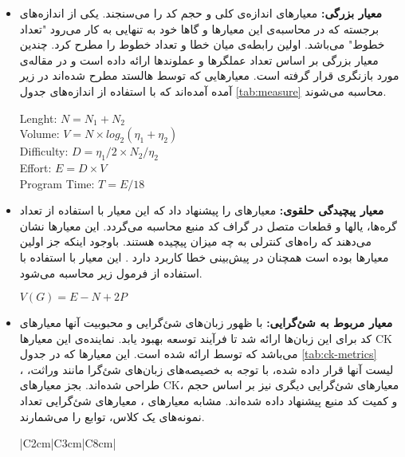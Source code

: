 \begin{itemize}
	\item \textbf{معیار بزرگی: }
معیارهای  اندازه‌ی کلی و حجم کد را می‌سنجند. یکی از اندازه‌های برجسته که در محاسبه‌ی این معیارها و گاها خود به تنهایی به کار می‌رود "تعداد خطوط" می‌باشد. اولین 
 \cite{akiyama1971example}  
رابطه‌ی میان خطا و تعداد خطوط را مطرح کرد. 
 \cite{halstead1977elements} 
 چندین معیار بزرگی بر اساس  تعداد عملگرها و عملوند‌ها ارائه داده است و در مقاله‌ی \cite{pawade2016exploring} مورد بازنگری قرار گرفته است. معیارهایی که توسط هالستد مطرح شده‌اند در زیر آمده آمده‌اند که با استفاده از اندازه‌های جدول \ref{tab:measure} محاسبه می‌شوند. 
 \begin{latin}
 \baselineskip=1.1cm
Lenght: $N = N_1 + N_2$ \\
Volume: $V = N \times log_2 (\eta_1 + \eta_2)$\\
Difficulty: $D = \eta_1/2 \times N_2/\eta_2$ \\
Effort: $E = D \times V$ \\
Program Time: $T = E/18$ \\
 \end{latin}
 
 
\item \textbf{معیار پیچیدگی حلقوی: }
 معیارهای 
را پیشنهاد داد که این معیار با استفاده از تعداد گره‌ها، یالها و قطعات متصل در گراف   کد منبع محاسبه می‌گردد\cite{mccabe1976complexity}. این معیارها نشان می‌دهند که راه‌های کنترلی به چه میزان پیچیده هستند. باوجود اینکه جز اولین معیارها بوده است همچنان در پیش‌بینی خطا کاربرد دارد \cite{malhotra2014comparative}. این معیار با استفاده با استفاده از فرمول زیر محاسبه می‌شود. 
\begin{latin}
$V(G) = E - N + 2P $
\end{latin}


\item \textbf{معیار مربوط به شئ‌گرایی: }
با ظهور زبان‌های شئ‌گرایی و محبوبیت آنها معیارهای کد  برای این زبان‌ها ارائه شد تا فرآیند توسعه بهبود یابد. نماینده‌ی این معیارها CK می‌باشد که توسط 
 ارائه شده است\cite{chidamber1994metrics}. این معیارها  که در جدول  \ref{tab:ck-metrics} لیست آنها قرار داده شده، با توجه به خصیصه‌های زبان‌های شئ‌گرا مانند وراثت، ،  طراحی شده‌اند. بجز معیارهای  CK، معیارهای شئ‌گرایی دیگری نیز بر اساس حجم و کمیت کد منبع پیشنهاد داده شده‌اند. مشابه معیارهای ، معیارهای شئ‌گرایی تعداد نمونه‌های یک کلاس، توابع را می‌شمارند. \\
 \begin{table}[H] 
 	\renewcommand*{\arraystretch}{1.5}	
 	\centering \caption{معیارهای CK }
 	\label{tab:ck-metrics}
 	\begin{tabular}{|C{2cm}|C{3cm}|C{8cm}|}
 		

\end{tabular}
\end{table}
\end{itemize}
